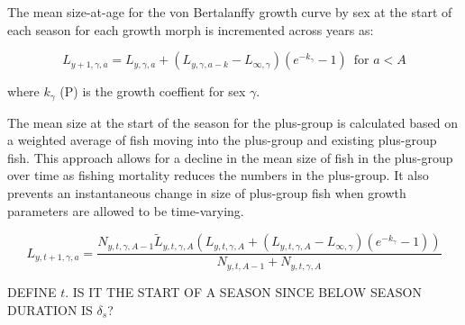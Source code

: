 \documentclass[11pt,
  english,
  letterpaper,
]{article}
\begin{document}
The mean size-at-age for the von Bertalanffy growth curve by sex at the start of each season for each growth morph is incremented across years as:

\leavevmode\tagmcend\tagstructend\par


\begin{equation}
\label{eqn9}
L_{y+1,\gamma,a} = L_{y,\gamma,a} + (L_{y,\gamma,a-k} - L_{\infty,\gamma}) (e^{-k_{\gamma}} - 1) \;\ \text{for $a<A$}
\end{equation}

\leavevmode\tagmcend\tagstructend\par


where {\(k_{\gamma}\)\leavevmode\tagmcend\tagstructend} (P) is the growth coeffient for sex {\(\gamma\)\leavevmode\tagmcend\tagstructend}.

\leavevmode\tagmcend\tagstructend\par


The mean size at the start of the season for the plus-group is calculated based on a weighted average of fish moving into the plus-group and existing plus-group fish. This approach allows for a decline in the mean size of fish in the plus-group over time as fishing mortality reduces the numbers in the plus-group. It also prevents an instantaneous change in size of plus-group fish when growth parameters are allowed to be time-varying.

\leavevmode\tagmcend\tagstructend\par


\begin{equation}
\label{eqn10}
L_{y,t+1,\gamma,a} = \frac{N_{y,t,\gamma,A-1} \tilde{L}_{y,t,\gamma,A} (L_{y,t,\gamma,A} + (L_{y,t,\gamma,A} - L_{\infty,\gamma}) (e^{-k_{\gamma}} - 1))}{ N_{y,t,A-1} + N_{y,t,\gamma,A} } 
\end{equation}

\leavevmode\tagmcend\tagstructend\par


DEFINE {\(t\)\leavevmode\tagmcend\tagstructend}. IS IT THE START OF A SEASON SINCE BELOW SEASON DURATION IS {\(\delta_s\)\leavevmode\tagmcend\tagstructend}?
\end{document}
